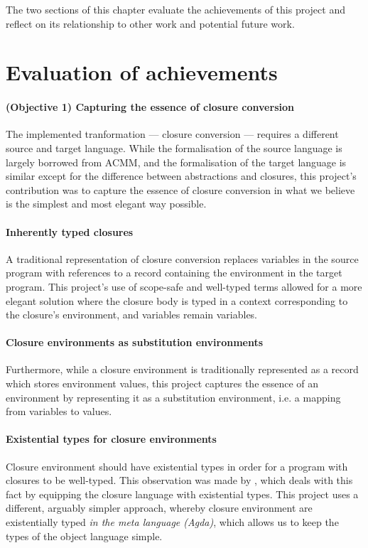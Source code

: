 \documentclass[bsc,frontabs,oneside,singlespacing,parskip,deptreport]{infthesis}
\theoremstyle{definition}
\theoremstyle{lemma}
\begin{document}
The two sections of this chapter evaluate the achievements of this
project and reflect on its relationship to other work and potential
future work.

\section{Evaluation of achievements}
\label{sec:eval-achi}

\paragraph{(Objective 1) Capturing the essence of closure conversion}
The implemented tranformation --- closure conversion --- requires a
different source and target language. While the formalisation of the
source language is largely borrowed from ACMM, and the formalisation
of the target language is similar except for the difference between
abstractions and closures, this project's contribution was to capture
the essence of closure conversion in what we believe is the simplest
and most elegant way possible.

\paragraph{Inherently typed closures}
A traditional representation of closure conversion replaces variables
in the source program with references to a record containing the
environment in the target program. This project's use of scope-safe
and well-typed terms allowed for a more elegant solution where the
closure body is typed in a context corresponding to the closure's
environment, and variables remain variables.

\paragraph{Closure environments as substitution environments}
Furthermore, while a closure environment is traditionally represented
as a record which stores environment values, this project captures the
essence of an environment by representing it as a substitution
environment, i.e. a mapping from variables to values.

\paragraph{Existential types for closure environments}
Closure environment should have existential types in order for a
program with closures to be well-typed. This observation was made by
\cite{DBLP:conf/popl/MinamideMH96}, which deals with this fact by
equipping the closure language with existential types. This project
uses a different, arguably simpler approach, whereby closure
environment are existentially typed \textit{in the meta language
  (Agda)}, which allows us to keep the types of the object language
simple.
\end{document}
